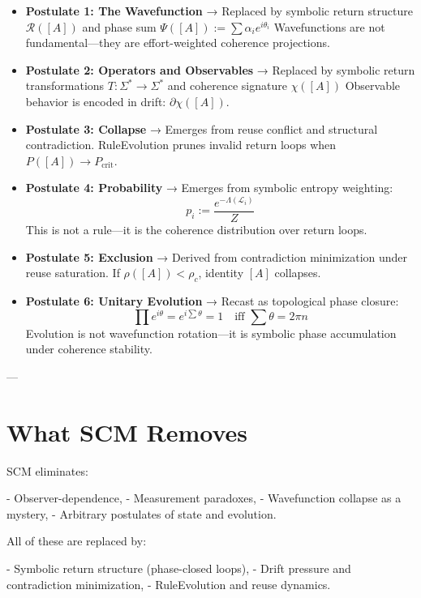 \begin{itemize}
  \item \textbf{Postulate 1: The Wavefunction}  
    → Replaced by symbolic return structure $\mathcal{R}([A])$ and phase sum $\Psi([A]) := \sum \alpha_i e^{i\theta_i}$  
    Wavefunctions are not fundamental—they are effort-weighted coherence projections.

  \item \textbf{Postulate 2: Operators and Observables}  
    → Replaced by symbolic return transformations $T: \Sigma^* \to \Sigma^*$ and coherence signature $\chi([A])$  
    Observable behavior is encoded in drift: $\partial \chi([A])$.

  \item \textbf{Postulate 3: Collapse}  
    → Emerges from reuse conflict and structural contradiction.  
    RuleEvolution prunes invalid return loops when $P([A]) \to P_{\text{crit}}$.

  \item \textbf{Postulate 4: Probability}  
    → Emerges from symbolic entropy weighting:  
    \[
    p_i := \frac{e^{-\Lambda(\mathcal{L}_i)}}{Z}
    \]  
    This is not a rule—it is the coherence distribution over return loops.

  \item \textbf{Postulate 5: Exclusion}  
    → Derived from contradiction minimization under reuse saturation.  
    If $\rho([A]) < \rho_c$, identity $[A]$ collapses.

  \item \textbf{Postulate 6: Unitary Evolution}  
    → Recast as topological phase closure:  
    \[
    \prod e^{i\theta} = e^{i\sum \theta} = 1 \quad \text{iff } \sum \theta = 2\pi n
    \]  
    Evolution is not wavefunction rotation—it is symbolic phase accumulation under coherence stability.
\end{itemize}

---

\section{What SCM Removes}

SCM eliminates:

- Observer-dependence,
- Measurement paradoxes,
- Wavefunction collapse as a mystery,
- Arbitrary postulates of state and evolution.

All of these are replaced by:

- Symbolic return structure (phase-closed loops),
- Drift pressure and contradiction minimization,
- RuleEvolution and reuse dynamics.

